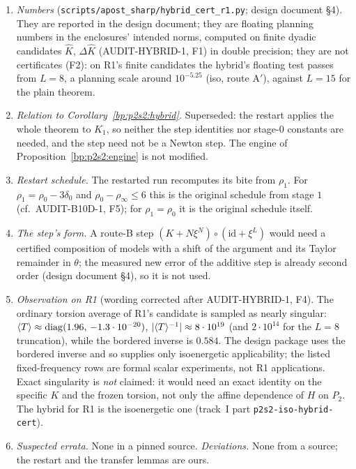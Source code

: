 \begin{remark}[Register]\label{bp:p2s2hc:register}
\begin{enumerate}[label=(\roman*)]
\item \emph{Numbers} (\texttt{scripts/apost\_sharp/hybrid\_cert\_r1.py}; design document \S4). They are reported in the design document; they
  are floating planning numbers in the enclosures' intended norms, computed on finite dyadic candidates $\hat K$, $\Delta\hat K$ (AUDIT-HYBRID-1,
  F1) in double precision; they are not certificates (F2): on R1's finite candidates the hybrid's floating test passes from $L=8$, a planning
  scale around $10^{-5.25}$ (iso, route A$'$), against $L=15$ for the plain theorem.
\item \emph{Relation to Corollary~\ref{bp:p2s2:hybrid}.} Superseded: the restart applies the whole theorem to $K_1$, so neither the step identities
  nor stage-$0$ constants are needed, and the step need not be a Newton step. The engine of Proposition~\ref{bp:p2s2:engine} is not modified.
\item \emph{Restart schedule.} The restarted run recomputes its bite from $\rho_1$. For $\rho_1=\rho_0-3\delta_0$ and $\rho_0-\rho_\infty\le6$ this is the original
  schedule from stage $1$ (cf.\ AUDIT-B10D-1, F5); for $\rho_1=\rho_0$ it is the original schedule itself.
\item \emph{The step's form.} A route-B step $(K+N\xi^N)\circ(\mathrm{id}+\xi^L)$ would need a certified composition of models with a shift of the argument
  and its Taylor remainder in $\theta$; the measured new error of the additive step is already second order (design document \S4), so it is
  not used.
\item \emph{Observation on R1} (wording corrected after AUDIT-HYBRID-1, F4). The ordinary torsion average of R1's candidate is sampled as nearly
  singular: $\langle T\rangle\approx\mathrm{diag}(1.96,\,{-1.3}\cdot10^{-20})$, $\lvert \langle T\rangle^{-1}\rvert\approx8\cdot10^{19}$ (and $2\cdot10^{14}$ for the $L=8$ truncation), while the
  bordered inverse is $0.584$. The design package uses the bordered inverse and so supplies only isoenergetic applicability; the listed
  fixed-frequency rows are formal scalar experiments, not R1 applications. Exact singularity is \emph{not} claimed: it would need an exact identity
  on the specific $K$ and the frozen torsion, not only the affine dependence of $H$ on $P_2$. The hybrid for R1 is the isoenergetic one (track~I
  part \texttt{p2s2-iso-hybrid-cert}).
\item \emph{Suspected errata.} None in a pinned source. \emph{Deviations.} None from a source; the restart and the transfer lemmas are ours.
\end{enumerate}
\end{remark}
